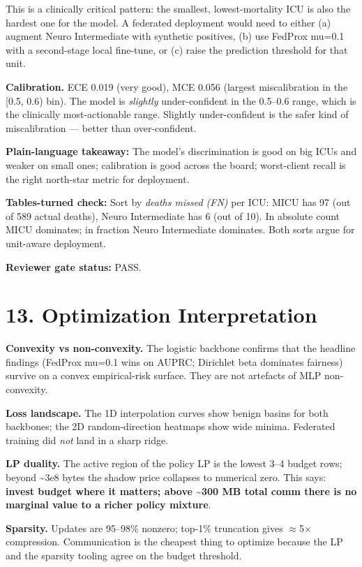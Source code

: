 \documentclass{article}
\begin{document}
This is a clinically critical pattern: the smallest, lowest-mortality ICU is also the hardest one for the model. A federated deployment would need to either (a) augment Neuro Intermediate with synthetic positives, (b) use FedProx mu=0.1 with a second-stage local fine-tune, or (c) raise the prediction threshold for that unit.


\textbf{Calibration.} ECE 0.019 (very good), MCE 0.056 (largest miscalibration in the [0.5, 0.6) bin). The model is \emph{slightly} under-confident in the 0.5--0.6 range, which is the clinically most-actionable range. Slightly under-confident is the safer kind of miscalibration --- better than over-confident.


\textbf{Plain-language takeaway:} The model's discrimination is good on big ICUs and weaker on small ones; calibration is good across the board; worst-client recall is the right north-star metric for deployment.


\textbf{Tables-turned check:} Sort by \emph{deaths missed (FN)} per ICU: MICU has 97 (out of 589 actual deaths), Neuro Intermediate has 6 (out of 10). In absolute count MICU dominates; in fraction Neuro Intermediate dominates. Both sorts argue for unit-aware deployment.


\textbf{Reviewer gate status:} PASS.



\clearpage
\section{13. Optimization Interpretation}


\textbf{Convexity vs non-convexity.} The logistic backbone confirms that the headline findings (FedProx mu=0.1 wins on AUPRC; Dirichlet beta dominates fairness) survive on a convex empirical-risk surface. They are not artefacts of MLP non-convexity.


\textbf{Loss landscape.} The 1D interpolation curves show benign basins for both backbones; the 2D random-direction heatmaps show wide minima. Federated training did \emph{not} land in a sharp ridge.


\textbf{LP duality.} The active region of the policy LP is the lowest 3--4 budget rows; beyond \textasciitilde{}3e8 bytes the shadow price collapses to numerical zero. This says: \textbf{invest budget where it matters; above \textasciitilde{}300 MB total comm there is no marginal value to a richer policy mixture}.


\textbf{Sparsity.} Updates are 95--98\% nonzero; top-1\% truncation gives \ensuremath{\approx}5\ensuremath{\times} compression. Communication is the cheapest thing to optimize because the LP and the sparsity tooling agree on the budget threshold.
\end{document}
